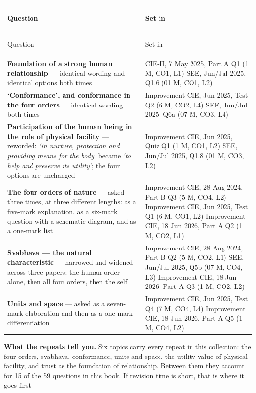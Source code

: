 \documentclass[11pt,a4paper,oneside]{book}
\newcommand{\hdr}[1]{{\sffamily\bfseries\color{white}\strut #1}}
\newenvironment{note}
  {\begin{tcolorbox}[colback=tint,colframe=ocre,boxrule=0.8pt,sharp corners,
     fontupper=\small,breakable,before skip=8pt,after skip=8pt]}
  {\end{tcolorbox}}
\begin{document}
\begin{longtable}{P{76mm} P{72mm}}
\hdr{Question} & \hdr{Set in} \\ \hline \endfirsthead
{}
\hdr{Question} & \hdr{Set in} \\ \hline \endhead
\textbf{Foundation of a strong human relationship} --- identical wording and
  identical options both times &
  CIE-II, 7 May 2025, Part A Q1 (1 M, CO1, L1)\newline
  SEE, Jun/Jul 2025, Q1.6 (01 M, CO1, L2) \\ \hline
\textbf{`Conformance', and conformance in the four orders} --- identical
  wording both times &
  Improvement CIE, Jun 2025, Test Q2 (6 M, CO2, L4)\newline
  SEE, Jun/Jul 2025, Q6a (07 M, CO3, L4) \\ \hline
\textbf{Participation of the human being in the role of physical facility}
  --- reworded: \emph{`in nurture, protection and providing means for the
  body'} became \emph{`to help and preserve its utility'}; the four options
  are unchanged &
  Improvement CIE, Jun 2025, Quiz Q1 (1 M, CO1, L2)\newline
  SEE, Jun/Jul 2025, Q1.8 (01 M, CO3, L2) \\ \hline
\textbf{The four orders of nature} --- asked three times, at three different
  lengths: as a five-mark explanation, as a six-mark question with a schematic
  diagram, and as a one-mark list &
  Improvement CIE, 28 Aug 2024, Part B Q3 (5 M, CO4, L2)\newline
  Improvement CIE, Jun 2025, Test Q1 (6 M, CO1, L2)\newline
  Improvement CIE, 18 Jun 2026, Part A Q2 (1 M, CO2, L1) \\ \hline
\textbf{Svabhava --- the natural characteristic} --- narrowed and widened
  across three papers: the human order alone, then all four orders, then the
  self &
  Improvement CIE, 28 Aug 2024, Part B Q2 (5 M, CO2, L1)\newline
  SEE, Jun/Jul 2025, Q5b (07 M, CO4, L3)\newline
  Improvement CIE, 18 Jun 2026, Part A Q3 (1 M, CO2, L2) \\ \hline
\textbf{Units and space} --- asked as a seven-mark elaboration and then as a
  one-mark differentiation &
  Improvement CIE, Jun 2025, Test Q4 (7 M, CO4, L4)\newline
  Improvement CIE, 18 Jun 2026, Part A Q5 (1 M, CO4, L2) \\ \hline
\end{longtable}

\begin{note}
\textbf{\sffamily What the repeats tell you.} Six topics carry every repeat in
this collection: the four orders, svabhava, conformance, units and space, the
utility value of physical facility, and trust as the foundation of
relationship. Between them they account for 15 of the 59 questions in this
book. If revision time is short, that is where it goes first.
\end{note}
\end{document}
